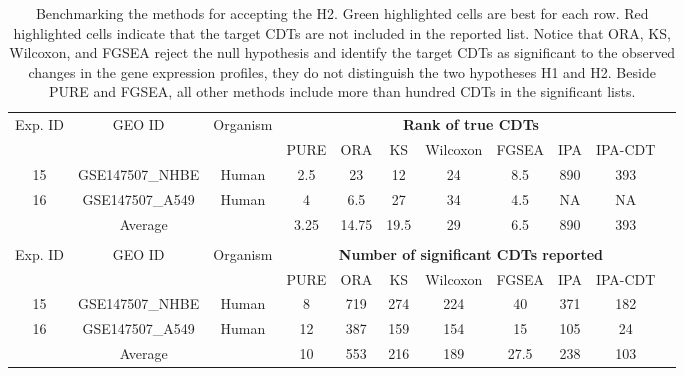 \begin{table}
\caption{\label{H2Result} Benchmarking the methods for accepting the H2. Green highlighted cells are best for each row. Red highlighted cells indicate that the target CDTs are not included in the reported list. Notice that ORA, KS, Wilcoxon, and FGSEA reject the null hypothesis and identify the target CDTs as significant to the observed changes in the gene expression profiles, they do not distinguish the two hypotheses H1 and H2. Beside PURE and FGSEA, all other methods include more than hundred CDTs in the significant lists.}
\begin{center}
\scriptsize
\begin{tabular}{ ccc|cccccccc } 

 \hline \hline

\multirow{2}{*}{Exp. ID}& \multirow{2}{*}{GEO ID}& \multirow{2}{*}{Organism}& \multicolumn{7}{c}{\textbf{Rank of true CDTs}} \\
& & &   PURE  & ORA & KS  & Wilcoxon & FGSEA & IPA & IPA-CDT\\
\hline
15	& GSE147507\_NHBE	& Human	&	\cellcolor{green}2.5	&	23	&	12	&	24	&	8.5	&	\cellcolor{red}890 &\cellcolor{red} 393\\
16	& GSE147507\_A549	& Human 	&	\cellcolor{green}4	&	6.5	&	27	&	34	&	4.5	& \cellcolor{red}NA & \cellcolor{red}NA\\
\hline
\multicolumn{3}{c}{Average}	& 	\cellcolor{green}3.25 	&	14.75	 & 	19.5 	& 	29 	& 	6.5 	& 	890 	&	393 \\ 
\hline 
 \multicolumn{10}{c}{}\\
\hline


\multirow{2}{*}{Exp. ID}& \multirow{2}{*}{GEO ID}& \multirow{2}{*}{Organism}& \multicolumn{7}{c}{\textbf{Number of significant CDTs reported}} \\
& & &   PURE  & ORA & KS  & Wilcoxon & FGSEA & IPA & IPA-CDT\\

\hline
15	& GSE147507\_NHBE	& Human	&	\cellcolor{green}8	&	719	&	274	&	224	&	40	&	\cellcolor{red}371& 	\cellcolor{red}182\\
16	& GSE147507\_A549	& Human 	&	\cellcolor{green}12	&	387	&	159	&	154	& 	15 	& 	\cellcolor{red}105&		\cellcolor{red}24\\
\hline
\multicolumn{3}{c}{Average}& \cellcolor{green}10 &	553 	&	216 	& 189 	& 	27.5 & 238 & 103 \\ 
\hline \hline
 
\end{tabular}
\end{center}
\end{table}

